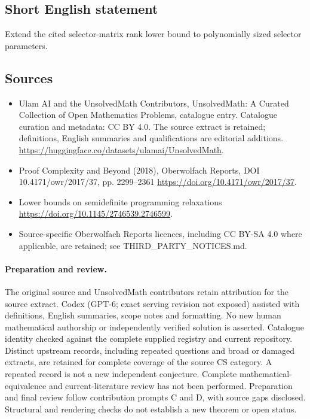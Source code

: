 \documentclass[11pt]{article}
\begin{document}
\subsection{Short English statement}
Extend the cited selector-matrix rank lower bound to polynomially sized selector parameters.
\subsection{Sources}
\begin{itemize}
\item[\hypertarget{source:statement:1}{S1}] Ulam AI and the UnsolvedMath Contributors, UnsolvedMath: A Curated Collection of Open Mathematics Problems, catalogue entry. Catalogue curation and metadata: CC BY 4.0. The source extract is retained; definitions, English summaries and qualifications are editorial additions.
\url{https://huggingface.co/datasets/ulamai/UnsolvedMath}.
\item[\hypertarget{source:statement:2}{S2}] Proof Complexity and Beyond (2018), Oberwolfach Reports, DOI 10.4171/owr/2017/37, pp. 2299--2361
\url{https://doi.org/10.4171/owr/2017/37}.
\item[\hypertarget{source:statement:3}{S3}] Lower bounds on semidefinite programming relaxations
\url{https://doi.org/10.1145/2746539.2746599}.
\item Source-specific Oberwolfach Reports licences, including CC BY-SA 4.0 where applicable, are retained; see THIRD\_PARTY\_NOTICES.md.
\end{itemize}
\paragraph{Preparation and review.}
The original source and UnsolvedMath contributors retain attribution for the source extract. Codex (GPT-6; exact serving revision not exposed) assisted with definitions, English summaries, scope notes and formatting. No new human mathematical authorship or independently verified solution is asserted. Catalogue identity checked against the complete supplied registry and current repository. Distinct upstream records, including repeated questions and broad or damaged extracts, are retained for complete coverage of the source CS category. A repeated record is not a new independent conjecture. Complete mathematical-equivalence and current-literature review has not been performed. Preparation and final review follow contribution prompts C and D, with source gaps disclosed. Structural and rendering checks do not establish a new theorem or open status.
\label{end:statement}
\end{document}
